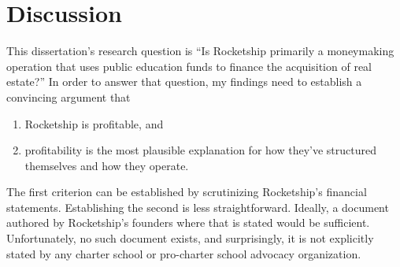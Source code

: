 
\chapter{Discussion}\label{ch:discussion}

\begin{comment}
  With sheer repetion, and in the absense of evidence, a myth about K-12 education has taken hold: American public schools are abject failures. Something must be done to reign in the rapacious unions who protect and coddle incompetent teachers. Something must be done about lazy administrators who block progress. Something must be done to give back to parents control over their children's education. And that something is charter schools.

  Rocketship is one of the most successful charter school chains in the United States, but their success is not in educating elementary school children. Case in point: In August 2023, the Fort Worth Star-Telegram reported that only 23\% of Rocketship's students met state standards in reading and language arts \parencite{Allen.Ruiz2023} compared to 53\% statewide \parencite{TexasEducationAgency2023}.

  Instead, Rocketship's success is in making money.
\end{comment}
This dissertation's research question is ``Is Rocketship primarily a moneymaking operation that uses public education funds to finance the acquisition of real estate?'' In order to answer that question, my findings need to establish a convincing argument that
\begin{enumerate}
  \item Rocketship is profitable, and
  \item profitability is the most plausible explanation for how they've structured themselves and how they operate.
\end{enumerate}

The first criterion can be established by scrutinizing Rocketship's financial statements. Establishing the second is less straightforward. Ideally, a document authored by Rocketship's founders where that is stated would be sufficient. Unfortunately, no such document exists, and surprisingly, it is not explicitly stated by any charter school or pro-charter school advocacy organization.

